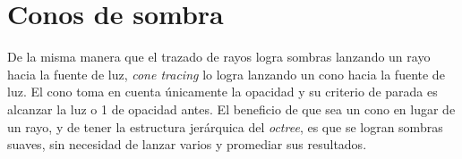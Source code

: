 \section{Conos de sombra}

De la misma manera que el trazado de rayos logra sombras lanzando un rayo hacia la fuente de luz, \textit{cone tracing} lo logra lanzando un cono hacia la fuente de luz.
El cono toma en cuenta únicamente la opacidad y su criterio de parada es alcanzar la luz o 1 de opacidad antes.
El beneficio de que sea un cono en lugar de un rayo, y de tener la estructura jerárquica del \textit{octree}, es que se logran sombras suaves, sin necesidad de lanzar varios y promediar sus resultados.


